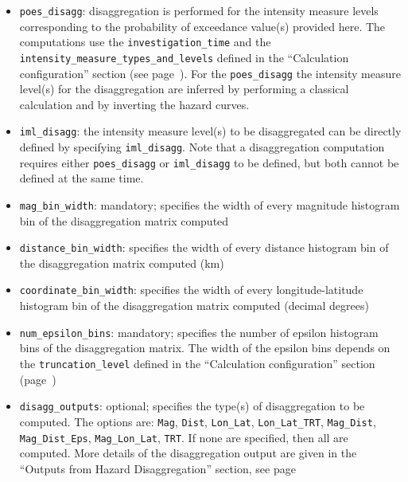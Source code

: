 \begin{itemize}

    \item \Verb+poes_disagg+: disaggregation is performed for the intensity
    measure levels corresponding to the probability of exceedance value(s) provided
    here. The computations use the \texttt{investigation\_time} and the
    \texttt{intensity\_measure\_types\_and\_levels} defined in the
    ``Calculation configuration'' section   (see page~\pageref{sec:calculation_configuration}).
    For the \texttt{poes\_disagg} the intensity measure level(s) for the disaggregation are
    inferred by performing a classical calculation and by inverting the hazard curves.

    \item \Verb+iml_disagg+: the intensity measure level(s) to be disaggregated can be directly defined
    by specifying \texttt{iml\_disagg}. Note that a
    disaggregation computation requires either \texttt{poes\_disagg} or
    \texttt{iml_disagg} to be defined, but both cannot be defined at the same time.

    \item \Verb+mag_bin_width+: mandatory; specifies the width of every magnitude
     histogram bin of the disaggregation matrix computed

    \item \Verb+distance_bin_width+: specifies the width of every distance
    histogram bin of the disaggregation matrix computed (km)

    \item \Verb+coordinate_bin_width+: specifies the width of every longitude-latitude
    histogram bin of the disaggregation matrix computed (decimal degrees)

    \item \Verb+num_epsilon_bins+: mandatory; specifies the number of epsilon
    histogram bins of the disaggregation matrix. The width of the epsilon bins
    depends on the \texttt{truncation\_level} defined in the
    ``Calculation configuration'' section (page~\pageref{sec:calculation_configuration})

    \item \Verb+disagg_outputs+: optional; specifies the type(s) of disaggregation
    to be computed. The options are: \texttt{Mag}, \texttt{Dist}, \texttt{Lon\_Lat},
    \texttt{Lon\_Lat\_TRT}, \texttt{Mag\_Dist}, \texttt{Mag\_Dist\_Eps},
    \texttt{Mag\_Lon\_Lat}, \texttt{TRT}. If none are specified, then all are
    computed. More details of the disaggregation output are given in the
    ``Outputs from Hazard Disaggregation'' section,
    see page~\pageref{subsec:output_hazard_disaggregation}


\end{itemize}

